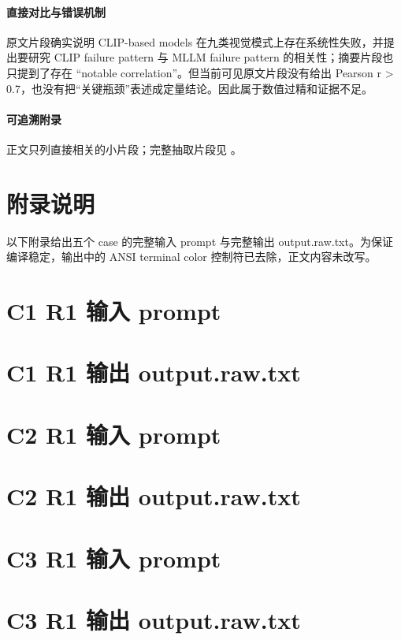 \documentclass[10pt]{ctexart}
\begin{document}
\paragraph{直接对比与错误机制} 原文片段确实说明 CLIP-based models 在九类视觉模式上存在系统性失败，并提出要研究 CLIP failure pattern 与 MLLM failure pattern 的相关性；摘要片段也只提到了存在 “notable correlation”。但当前可见原文片段没有给出 Pearson r > 0.7，也没有把“关键瓶颈”表述成定量结论。因此属于数值过精和证据不足。
\paragraph{可追溯附录} 正文只列直接相关的小片段；完整抽取片段见 。

\appendix
\section{附录说明}
以下附录给出五个 case 的完整输入 prompt 与完整输出 output.raw.txt。为保证编译稳定，输出中的 ANSI terminal color 控制符已去除，正文内容未改写。

\section{C1 R1 输入 prompt}
\section{C1 R1 输出 output.raw.txt}

\section{C2 R1 输入 prompt}
\section{C2 R1 输出 output.raw.txt}

\section{C3 R1 输入 prompt}
\section{C3 R1 输出 output.raw.txt}
\end{document}
